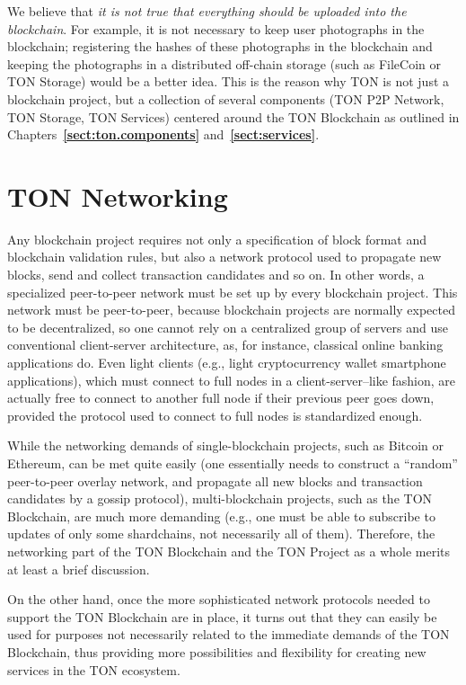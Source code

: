 \documentclass[12pt,oneside]{article}
\def\refpoint#1{{\rm\textbf{\ref{#1}}}}
\let\ptref=\refpoint
\def\mysection#1{\section{#1}\fancyhead[C]{\textsc{Глава \textbf{\thesection.} #1}}}
\begin{document}
We believe that {\em it is not true that everything should be uploaded
  into the blockchain}. For example, it is not necessary to keep user
photographs in the blockchain; registering the hashes of these
photographs in the blockchain and keeping the photographs in a
distributed off-chain storage (such as FileCoin or TON Storage) would
be a better idea. This is the reason why TON is not just a blockchain
project, but a collection of several components (TON P2P Network, TON
Storage, TON Services) centered around the TON Blockchain as outlined
in Chapters~\ptref{sect:ton.components} and~\ptref{sect:services}.

%
%
%
%

\clearpage
\mysection{TON Networking}\label{sect:network}

Any blockchain project requires not only a specification of block
format and blockchain validation rules, but also a network protocol
used to propagate new blocks, send and collect transaction candidates
and so on. In other words, a specialized peer-to-peer network must be
set up by every blockchain project. This network must be peer-to-peer,
because blockchain projects are normally expected to be decentralized,
so one cannot rely on a centralized group of servers and use
conventional client-server architecture, as, for instance, classical
online banking applications do. Even light clients (e.g., light
cryptocurrency wallet smartphone applications), which must connect to
full nodes in a client-server--like fashion, are actually free to
connect to another full node if their previous peer goes down,
provided the protocol used to connect to full nodes is standardized
enough.

While the networking demands of single-blockchain projects, such as
Bitcoin or Ethereum, can be met quite easily (one essentially needs to
construct a ``random'' peer-to-peer overlay network, and propagate all
new blocks and transaction candidates by a gossip protocol),
multi-blockchain projects, such as the TON Blockchain, are much more
demanding (e.g., one must be able to subscribe to updates of only some
shardchains, not necessarily all of them). Therefore, the networking
part of the TON Blockchain and the TON Project as a whole merits at
least a brief discussion.

On the other hand, once the more sophisticated network protocols
needed to support the TON Blockchain are in place, it turns out that
they can easily be used for purposes not necessarily related to the
immediate demands of the TON Blockchain, thus providing more
possibilities and flexibility for creating new services in the TON
ecosystem.
\end{document}
